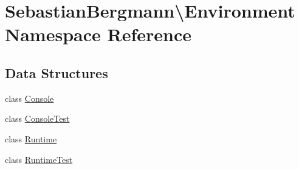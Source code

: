 \hypertarget{namespace_sebastian_bergmann_1_1_environment}{}\section{Sebastian\+Bergmann\textbackslash{}Environment Namespace Reference}
\label{namespace_sebastian_bergmann_1_1_environment}
\subsection*{Data Structures}
\begin{DoxyCompactItemize}
\item 
class \mbox{\hyperlink{class_sebastian_bergmann_1_1_environment_1_1_console}{Console}}
\item 
class \mbox{\hyperlink{class_sebastian_bergmann_1_1_environment_1_1_console_test}{Console\+Test}}
\item 
class \mbox{\hyperlink{class_sebastian_bergmann_1_1_environment_1_1_runtime}{Runtime}}
\item 
class \mbox{\hyperlink{class_sebastian_bergmann_1_1_environment_1_1_runtime_test}{Runtime\+Test}}
\end{DoxyCompactItemize}

